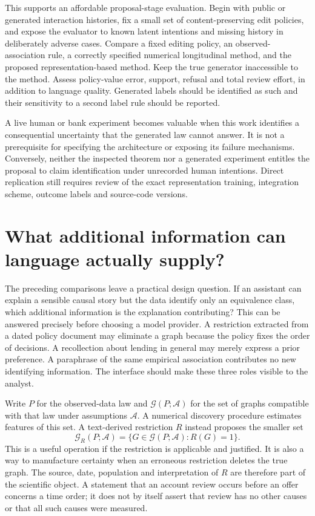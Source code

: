 This supports an affordable proposal-stage evaluation. Begin with public
or generated interaction histories, fix a small set of
content-preserving edit policies, and expose the evaluator to known
latent intentions and missing history in deliberately adverse cases.
Compare a fixed editing policy, an observed-association rule, a
correctly specified numerical longitudinal method, and the proposed
representation-based method. Keep the true generator inaccessible to the
method. Assess policy-value error, support, refusal and total review
effort, in addition to language quality. Generated labels should be
identified as such and their sensitivity to a second label rule should
be reported.

A live human or bank experiment becomes valuable when this work
identifies a consequential uncertainty that the generated law cannot
answer. It is not a prerequisite for specifying the architecture or
exposing its failure mechanisms. Conversely, neither the inspected
theorem nor a generated experiment entitles the proposal to claim
identification under unrecorded human intentions. Direct replication
still requires review of the exact representation training, integration
scheme, outcome labels and source-code versions.

\label{exec13:census-temporal-end}


\section{What additional information can language actually supply?}
\label{exec14:l4-development}

The preceding comparisons leave a practical design question. If an assistant
can explain a sensible causal story but the data identify only an equivalence
class, which additional information is the explanation contributing? This can
be answered precisely before choosing a model provider. A restriction extracted
from a dated policy document may eliminate a graph because the policy fixes the
order of decisions. A recollection about lending in general may merely express
a prior preference. A paraphrase of the same empirical association contributes
no new identifying information. The interface should make these three roles
visible to the analyst.

Write $P$ for the observed-data law and $\mathcal G(P;\mathcal A)$ for the set
of graphs compatible with that law under assumptions $\mathcal A$. A numerical
discovery procedure estimates features of this set. A text-derived restriction
$R$ instead proposes the smaller set
\[
 \mathcal G_R(P;\mathcal A)=\{G\in\mathcal G(P;\mathcal A):R(G)=1\}.
\]
This is a useful operation if the restriction is applicable and justified. It
is also a way to manufacture certainty when an erroneous restriction deletes
the true graph. The source, date, population and interpretation of $R$ are
therefore part of the scientific object. A statement that an account review
occurs before an offer concerns a time order; it does not by itself assert that
review has no other causes or that all such causes were measured.

